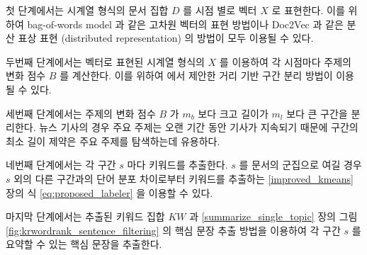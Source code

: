 \documentclass[oneside, ko,phd]{snuthesis_utf8_kor}
\begin{document}
첫 단계에서는 시계열 형식의 문서 집합 $D$ 를 시점 별로 벡터 $X$ 로 표현한다.
이를 위하여 bag-of-words model 과 같은 고차원 벡터의 표현 방법이나 Doc2Vec 과 같은 분산 표상 표현 (distributed representation) 의 방법이 모두 이용될 수 있다.

두번째 단계에서는 벡터로 표현된 시계열 형식의 $X$ 를 이용하여 각 시점마다 주제의 변화 점수 $B$ 를 계산한다.
이를 위하여 \cite{kim2019representation} 에서 제안한 거리 기반 구간 분리 방법이 이용될 수 있다.

세번째 단계에서는 주제의 변화 점수 $B$ 가 $m_b$ 보다 크고 길이가 $m_l$ 보다 큰 구간을 분리한다.
뉴스 기사의 경우 주요 주제는 오랜 기간 동안 기사가 지속되기 때문에 구간의 최소 길이 제약은 주요 주제를 탐색하는데 유용하다.

네번째 단계에서는 각 구간 $s$ 마다 키워드를 추출한다.
$s$ 를 문서의 군집으로 여길 경우 $s$ 외의 다른 구간과의 단어 분포 차이로부터 키워드를 추출하는  \ref{improved_kmeans} 장의 식 \ref{eq:proposed_labeler} 을 이용할 수 있다.

마지막 단계에서는 추출된 키워드 집합 $KW$ 과 \ref{summarize_single_topic} 장의 그림 \ref{fig:krwordrank_sentence_filtering} 의 핵심 문장 추출 방법을 이용하여 각 구간 $s$ 를 요약할 수 있는 핵심 문장을 추출한다.
\end{document}
